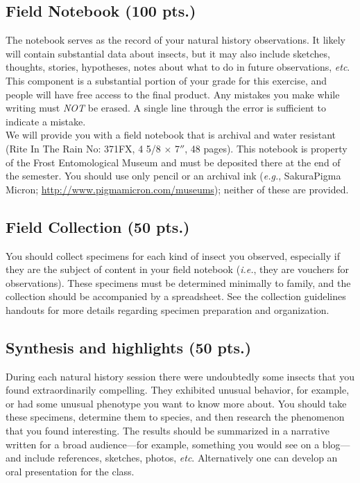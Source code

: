\documentclass[letterpaper, 11pt]{article}
\begin{document}
\subsection*{Field Notebook (100 pts.)}
The notebook serves as the record of your natural history observations. It likely will contain substantial data about insects, but it may also include sketches, thoughts, stories, hypotheses, notes about what to do in future observations, \textit{etc}. This component is a substantial portion of your grade for this exercise, and people will have free access to the final product. Any mistakes you make while writing must \textit{NOT} be erased. A single line through the error is sufficient to indicate a mistake.\\

\noindent{}We will provide you with a field notebook that is archival and water resistant (Rite In The Rain No: 371FX, 4 5/8 $\times$ 7$''$, 48 pages). This notebook is property of the Frost Entomological Museum and must be deposited there at the end of the semester. You should use only pencil or an archival ink (\textit{e.g.}, Sakura\textregistered{ }Pigma Micron\textregistered; \url{http://www.pigmamicron.com/museums}); neither of these are provided. 

\subsection*{Field Collection (50 pts.)}
You should collect specimens for each kind of insect you observed, especially if they are the subject of content in your field notebook (\textit{i.e.}, they are vouchers for observations). These specimens must be determined minimally to family, and the collection should be accompanied by a spreadsheet. See the collection guidelines handouts for more details regarding specimen preparation and organization.

\subsection*{Synthesis and highlights (50 pts.)}
During each natural history session there were undoubtedly some insects that you found extraordinarily compelling. They exhibited unusual behavior, for example, or had some unusual phenotype you want to know more about. You should take these specimens, determine them to species, and then research the phenomenon that you found interesting. The results should be summarized in a narrative written for a broad audience---for example, something you would see on a blog---and include references, sketches, photos, \textit{etc}. Alternatively one can develop an oral presentation for the class.
\end{document}
